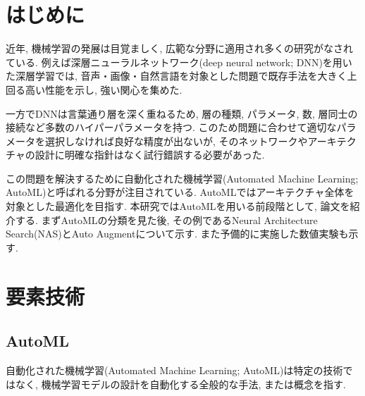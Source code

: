 \documentclass[twocolumn]{jarticle}     %
\begin{document}




\section{はじめに}

近年, 機械学習の発展は目覚ましく, 広範な分野に適用され多くの研究がなされている.
例えば深層ニューラルネットワーク(deep neural network; DNN)を用いた深層学習では, 音声・画像・自然言語を対象とした問題で既存手法を大きく上回る高い性能を示し, 強い関心を集めた.

一方でDNNは言葉通り層を深く重ねるため, 層の種類, パラメータ, 数, 層同士の接続など多数のハイパーパラメータを持つ.
このため問題に合わせて適切なパラメータを選択しなければ良好な精度が出ないが, そのネットワークやアーキテクチャの設計に明確な指針はなく試行錯誤する必要があった.

この問題を解決するために自動化された機械学習(Automated Machine Learning; AutoML)と呼ばれる分野が注目されている. AutoMLではアーキテクチャ全体を対象とした最適化を目指す.
本研究ではAutoMLを用いる前段階として, 論文を紹介する. まずAutoMLの分類を見た後, その例であるNeural Architecture Search(NAS)とAuto Augmentについて示す.
また予備的に実施した数値実験も示す.

\section{要素技術}
\subsection{AutoML}
自動化された機械学習(Automated Machine Learning; AutoML)\cite{SurveyAutoML}は特定の技術ではなく, 機械学習モデルの設計を自動化する全般的な手法, または概念を指す.
\end{document}
